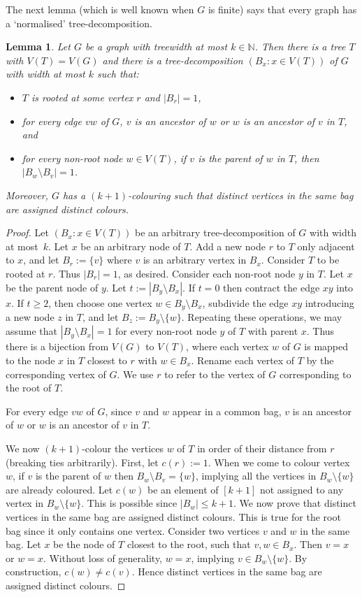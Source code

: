 \documentclass[a4paper,11pt]{article}
\theoremstyle{plain}
\newtheorem{lem}[thm]{Lemma}
\theoremstyle{definition}
\renewcommand{\geq}{\geqslant}
\renewcommand{\leq}{\leqslant}
\newcommand{\NN}{\mathbb{N}}
\begin{document}
The next lemma (which is well known when $G$ is finite) says that every graph has a `normalised' tree-decomposition. 

\begin{lem}
\label{StandardTreewidth}
Let $G$ be a graph with treewidth at most $k\in\NN$. Then there is a tree $T$ with $V(T)=V(G)$ and there is a tree-decomposition $(B_x:x\in V(T))$ of $G$ with width at most $k$ such that:
\begin{itemize}
\item $T$ is rooted at some vertex $r$ and $|B_r|=1$, 
\item for every edge $vw$ of $G$, $v$ is an ancestor of $w$ or $w$ is an ancestor of $v$ in $T$, and
\item for every non-root node $w\in V(T)$, if $v$ is the parent of $w$ in $T$, then $|B_w\setminus B_v|=1$. 
\end{itemize}
Moreover, $G$ has a $(k+1)$-colouring such that distinct vertices in the same bag are assigned distinct colours. 
\end{lem}

\begin{proof}
Let $(B_x:x\in V(T))$ be an arbitrary tree-decomposition of $G$ with width at most~$k$. Let $x$ be an arbitrary node of $T$. Add a new node $r$ to $T$ only adjacent to $x$, and let $B_r:=\{v\}$ where $v$ is an arbitrary vertex in $B_x$. Consider $T$ to be rooted at $r$. Thus $|B_r|=1$, as desired. Consider each non-root node $y$ in $T$. Let $x$ be the parent node of $y$. Let $t:= |B_y\setminus B_x|$.  If $t=0$ then contract the edge $xy$ into $x$. If $t\geq 2$, then choose one vertex $w\in B_y\setminus B_x$,  subdivide the edge $xy$ introducing a new node $z$ in $T$, and let $B_z := B_y\setminus \{w\}$. Repeating these operations, we may assume that $|B_y\setminus B_x|=1$ for every non-root node $y$ of $T$ with parent $x$. Thus there is a bijection from $V(G)$ to $V(T)$, where each vertex $w$ of $G$ is mapped to the node $x$ in $T$ closest to $r$ with $w\in B_x$. Rename each vertex of $T$ by the corresponding vertex of $G$. We use $r$ to refer to the vertex of $G$ corresponding to the root of $T$. 

For every edge $vw$ of $G$, since $v$ and $w$ appear in a common bag, $v$ is an ancestor of $w$ or $w$ is an ancestor of $v$ in $T$. 

We now $(k+1)$-colour the vertices $w$ of $T$ in order of their distance from $r$ (breaking ties arbitrarily). First, let $c(r):=1$. When we come to colour vertex $w$, if $v$ is the parent of $w$ then $B_w\setminus B_v=\{w\}$, implying all the vertices in $B_w\setminus \{w\}$ are already coloured. Let $c(w)$ be an element of $[k+1]$ not assigned to any vertex in $B_w\setminus \{w\}$. This is possible since $|B_w|\leq k+1$. We now prove that distinct vertices in the same bag are assigned distinct colours. This is true for the root bag since it only contains one vertex. Consider two vertices $v$ and $w$ in the same bag. Let $x$ be the node of $T$ closest to the root, such that $v,w\in B_x$. Then $v=x$ or $w=x$. Without loss of generality, $w=x$, implying $v\in B_w\setminus\{w\}$. By construction, $c(w)\neq c(v)$. Hence distinct vertices in the same bag are assigned distinct colours. 
\end{proof}
\end{document}
